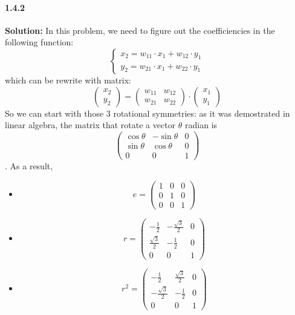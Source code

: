 \documentclass[11pt]{report}
\begin{document}
\paragraph{1.4.2}
\textbf{Solution:} In this problem, we need to figure out the coefficiencies in the following function:
    \[\left\{\begin{array}{l} x_2 = w_{11} \cdot x_1 + w_{12} \cdot y_1 \\ y_2 = w_{21} \cdot x_1 + w_{22} \cdot y_1 \end{array} \right.\]
    which can be rewrite with matrix:
    \[\left(\begin{array}{l} x_2 \\ y_2 \end{array} \right) = \left(\begin{array}{ll} w_{11} & w_{12} \\ w_{21} & w_{22} \end{array} \right) \cdot \left(\begin{array}{l} x_1 \\ y_1 \end{array} \right)\]
    So we can start with those 3 rotational symmetries: as it was demostrated in linear algebra, the matrix that rotate a vector $\theta$ radian is \[\left(\begin{array}{rrr} \cos\theta &  -\sin\theta & 0\\ \sin\theta & \cos\theta & 0 \\ 0 & 0 & 1 \end{array} \right)\]. As a result, 
    \begin{itemize}
        \item \[e = \left(\begin{array}{rrr} 1 & 0 & 0\\ 0 & 1 & 0 \\ 0 & 0 & 1\end{array} \right)\]
        \item \[r = \left(\begin{array}{rrr} -\frac{1}{2} & -\frac{\sqrt{3}}{2} & 0 \\  \frac{\sqrt{3}}{2} & -\frac{1}{2} & 0 \\ 0 & 0 & 1 \end{array} \right)\]
        \item \[r^2 = \left(\begin{array}{rrr} -\frac{1}{2} &\frac{\sqrt{3}}{2} & 0 \\  -\frac{\sqrt{3}}{2} & -\frac{1}{2} & 0 \\ 0 & 0 & 1\end{array} \right)\]
    \end{itemize}
\end{document}
